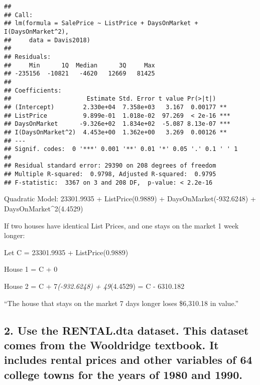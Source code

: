 \documentclass[
]{article}
\begin{document}
\begin{verbatim}
## 
## Call:
## lm(formula = SalePrice ~ ListPrice + DaysOnMarket + I(DaysOnMarket^2), 
##     data = Davis2018)
## 
## Residuals:
##     Min      1Q  Median      3Q     Max 
## -235156  -10821   -4620   12669   81425 
## 
## Coefficients:
##                     Estimate Std. Error t value Pr(>|t|)    
## (Intercept)        2.330e+04  7.358e+03   3.167  0.00177 ** 
## ListPrice          9.899e-01  1.018e-02  97.269  < 2e-16 ***
## DaysOnMarket      -9.326e+02  1.834e+02  -5.087 8.13e-07 ***
## I(DaysOnMarket^2)  4.453e+00  1.362e+00   3.269  0.00126 ** 
## ---
## Signif. codes:  0 '***' 0.001 '**' 0.01 '*' 0.05 '.' 0.1 ' ' 1
## 
## Residual standard error: 29390 on 208 degrees of freedom
## Multiple R-squared:  0.9798, Adjusted R-squared:  0.9795 
## F-statistic:  3367 on 3 and 208 DF,  p-value: < 2.2e-16
\end{verbatim}

Quadratic Model: 23301.9935 + ListPrice(0.9889) +
DaysOnMarket(-932.6248) + DaysOnMarket\^{}2(4.4529)

If two houses have identical List Prices, and one stays on the market 1
week longer:

Let C = 23301.9935 + ListPrice(0.9889)

House 1 = C + 0

House 2 = C + 7\emph{(-932.6248) + 49}(4.4529) = C - 6310.182

``The house that stays on the market 7 days longer loses \$6,310.18 in
value.''

\newpage

\hypertarget{use-the-rental.dta-dataset.-this-dataset-comes-from-the-wooldridge-textbook.-it-includes-rental-prices-and-other-variables-of-64-college-towns-for-the-years-of-1980-and-1990.}{%
\subsection{2. Use the RENTAL.dta dataset. This dataset comes from the
Wooldridge textbook. It includes rental prices and other variables of 64
college towns for the years of 1980 and
1990.}\label{use-the-rental.dta-dataset.-this-dataset-comes-from-the-wooldridge-textbook.-it-includes-rental-prices-and-other-variables-of-64-college-towns-for-the-years-of-1980-and-1990.}}
\end{document}
